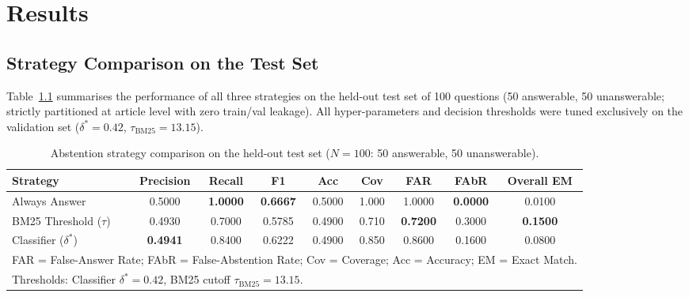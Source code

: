 \chapter{Results}
\label{chap:results}

\section{Strategy Comparison on the Test Set}
\label{sec:results_comparison}

Table~\ref{tab:strategy_comparison} summarises the performance of all three
strategies on the held-out test set of 100 questions (50 answerable, 50 unanswerable;
strictly partitioned at article level with zero train/val leakage). All hyper-parameters
and decision thresholds were tuned exclusively on the validation set ($\delta^* = 0.42$, $\tau_{\text{BM25}} = 13.15$).

\begin{table}[htbp]
  \centering
  \caption{Abstention strategy comparison on the held-out test set ($N=100$: 50 answerable, 50 unanswerable).}
  \label{tab:strategy_comparison}
  \small
  \begin{tabular}{lcccccccc}
    \toprule
    \textbf{Strategy} & \textbf{Precision} & \textbf{Recall} & \textbf{F1} & \textbf{Acc} & \textbf{Cov} & \textbf{FAR} & \textbf{FAbR} & \textbf{Overall EM} \\
    \midrule
    Always Answer            & 0.5000 & \textbf{1.0000} & \textbf{0.6667} & 0.5000 & 1.000 & 1.0000 & \textbf{0.0000} & 0.0100 \\
    BM25 Threshold ($\tau$)   & 0.4930 & 0.7000          & 0.5785          & 0.4900 & 0.710 & \textbf{0.7200} & 0.3000          & \textbf{0.1500} \\
    Classifier ($\delta^*$)  & \textbf{0.4941} & 0.8400 & 0.6222          & 0.4900 & 0.850 & 0.8600          & 0.1600          & 0.0800 \\
    \bottomrule
    \multicolumn{9}{l}{\small FAR = False-Answer Rate; FAbR = False-Abstention Rate; Cov = Coverage; Acc = Accuracy; EM = Exact Match.} \\
    \multicolumn{9}{l}{\small Thresholds: Classifier $\delta^* = 0.42$, BM25 cutoff $\tau_{\text{BM25}} = 13.15$.} \\
  \end{tabular}
\end{table}

